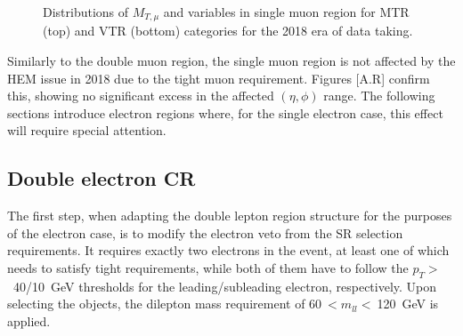\begin{figure}[htbp]
{    }
  \caption{Distributions of $M_{T,\mu}$ and \mindphinomu variables in single muon region for MTR (top) and VTR (bottom) categories for the 2018 era of data taking.}
  \label{fig:2018_Wmunu_2}
\end{figure}

\newpage



\hspace{10pt} Similarly to the double muon region, the single muon region is not affected by the HEM issue in 2018 due to the tight muon requirement. Figures [A.R] confirm this, showing no significant excess in the affected $(\eta, \phi)$ range. The following sections introduce electron regions where, for the single electron case, this effect will require special attention.

\subsection{Double electron CR}
\hspace{10pt} The first step, when adapting the double lepton region structure for the purposes of the electron case, is to modify the electron veto from the SR selection requirements. It requires exactly two electrons in the event, at least one of which needs to satisfy tight requirements, while both of them have to follow the $p_T>$~40/10~GeV thresholds for the leading/subleading electron, respectively. Upon selecting the objects, the dilepton mass requirement of 60$~<m_{ll}<~$120~GeV is applied.

